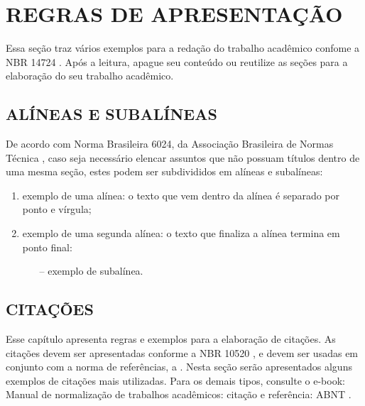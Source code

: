\chapter{REGRAS DE APRESENTAÇÃO} 

Essa seção traz vários exemplos para a redação do trabalho acadêmico confome a NBR 14724 \cite{NBR14724}. Após a leitura, apague seu conteúdo ou reutilize as seções para a elaboração do seu trabalho acadêmico.

\section{ALÍNEAS E SUBALÍNEAS} 

De acordo com Norma Brasileira 6024, da Associação Brasileira de Normas Técnica \cite{NBR6024}, caso seja necessário elencar assuntos que não possuam títulos dentro de uma mesma seção, estes podem ser subdivididos em alíneas e subalíneas:

\begin{enumerate}[label=\alph*)]
	\item exemplo de uma alínea: o texto que vem dentro da alínea é separado por ponto e vírgula;
	\item exemplo de uma segunda alínea: o texto que finaliza a alínea termina em ponto final:
	\begin{itemize}
		\item[--] exemplo de subalínea.
	\end{itemize}
\end{enumerate}       

\section{CITAÇÕES}

Esse capítulo apresenta regras e exemplos para a elaboração de citações. As citações devem ser apresentadas conforme a NBR 10520 \cite{NBR10520}, e devem ser usadas em conjunto com a norma de referências, a .
Nesta seção serão apresentados alguns exemplos de citações mais utilizadas. Para os demais tipos, consulte o e-book: Manual de normalização de trabalhos acadêmicos: citação e referência: ABNT \cite{unesp2020ref}.


